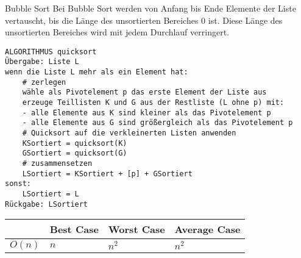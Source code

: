 \begin{zitat}{Bubble Sort}
Bei Bubble Sort werden von Anfang bis Ende Elemente der Liste vertauscht, bis die Länge des unsortierten Bereiches 0 ist. Diese Länge des unsortierten Bereiches wird mit jedem Durchlauf verringert.
\end{zitat}
\begin{lstlisting}
ALGORITHMUS quicksort
Übergabe: Liste L
wenn die Liste L mehr als ein Element hat:
    # zerlegen
    wähle als Pivotelement p das erste Element der Liste aus
    erzeuge Teillisten K und G aus der Restliste (L ohne p) mit:
    - alle Elemente aus K sind kleiner als das Pivotelement p
    - alle Elemente aus G sind größergleich als das Pivotelement p
    # Quicksort auf die verkleinerten Listen anwenden
    KSortiert = quicksort(K)
    GSortiert = quicksort(G)
    # zusammensetzen
    LSortiert = KSortiert + [p] + GSortiert
sonst:
    LSortiert = L
Rückgabe: LSortiert
\end{lstlisting}
\begin{table}[h]
\label{tab:my-table}
\begin{tabular}{l|l|l|l|}
\cline{2-4}
                             & Best Case & Worst Case & Average Case \\ \hline
\multicolumn{1}{|l|}{$O(n)$} & $n$     & $n^2$      & $n^2$        \\ \hline
\end{tabular}
\end{table}

